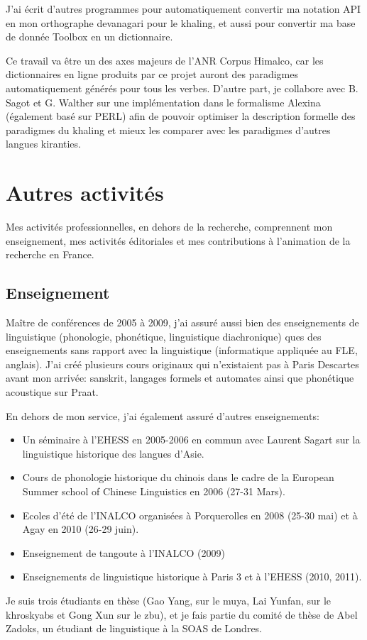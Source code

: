 \documentclass[oldfontcommands,oneside,a4paper,11pt]{memoir}
\begin{document}
J'ai écrit d'autres programmes pour automatiquement convertir   ma notation API en mon orthographe devanagari pour le khaling, et aussi pour convertir ma base de donnée Toolbox en un dictionnaire.

Ce travail va être un des axes majeurs de l'ANR Corpus Himalco, car les dictionnaires en ligne produits par ce projet auront des paradigmes automatiquement générés pour tous les verbes. D'autre part, je collabore avec B. Sagot et G. Walther sur une implémentation dans le formalisme Alexina (également basé sur PERL) afin de pouvoir optimiser la description formelle des paradigmes du khaling et mieux les comparer avec les paradigmes d'autres langues kiranties.


\chapter{Autres activités}
Mes activités professionnelles, en dehors de la recherche, comprennent mon enseignement, mes activités éditoriales et mes contributions à l'animation de la recherche en France.

\section{Enseignement}
 Maître de conférences de 2005 à 2009, j’ai assuré aussi bien des enseignements de linguistique (phonologie, phonétique, linguistique diachronique) ques des enseignements sans rapport avec la linguistique (informatique appliquée au FLE, anglais). J’ai créé plusieurs cours originaux qui n’existaient pas à Paris Descartes avant mon arrivée: sanskrit, langages formels et automates ainsi que phonétique acoustique sur Praat.
 

En dehors de mon service, j’ai également assuré d’autres enseignements:

\begin{itemize}
\item Un séminaire à l’EHESS en 2005-2006 en commun avec Laurent Sagart sur la linguistique historique des langues d’Asie.
\item Cours de phonologie historique du chinois dans le cadre de la European Summer school of Chinese Linguistics en 2006 (27-31 Mars). 
\item Ecoles d'été de l'INALCO organisées à Porquerolles en 2008 (25-30 mai) et à Agay en 2010 (26-29 juin).
\item Enseignement de tangoute à l'INALCO (2009) 
\item Enseignements de linguistique historique à Paris 3 et à l'EHESS (2010, 2011).
\end{itemize}
Je suis trois étudiants en thèse (Gao Yang, sur le muya, Lai Yunfan, sur le khroskyabs et Gong Xun sur le zbu), et je fais partie du comité de thèse de Abel Zadoks, un étudiant de linguistique à la SOAS de Londres.
\end{document}
